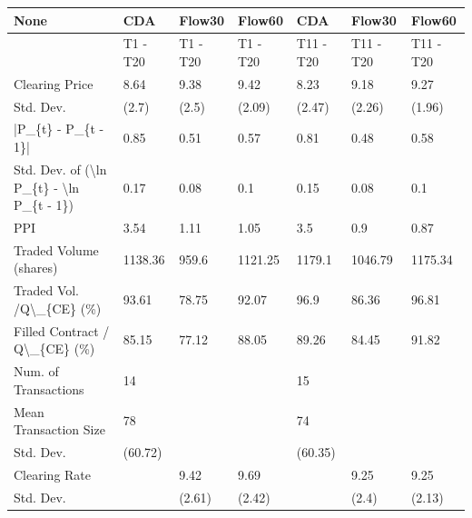 \begin{tabular}{lllllll}
\hline
 None                                                      & CDA      & Flow30   & Flow60   & CDA       & Flow30    & Flow60    \\
\hline
                                                           & T1 - T20 & T1 - T20 & T1 - T20 & T11 - T20 & T11 - T20 & T11 - T20 \\
 Clearing Price                                            & 8.64     & 9.38     & 9.42     & 8.23      & 9.18      & 9.27      \\
 Std. Dev.                                                 & (2.7)    & (2.5)    & (2.09)   & (2.47)    & (2.26)    & (1.96)    \\
 |P\_\{t\} - P\_\{t - 1\}|                                       & 0.85     & 0.51     & 0.57     & 0.81      & 0.48      & 0.58      \\
 Std. Dev. of (\textbackslash{}ln P\_\{t\} - \textbackslash{}ln P\_\{t - 1\})                  & 0.17     & 0.08     & 0.1      & 0.15      & 0.08      & 0.1       \\
 PPI                                                       & 3.54     & 1.11     & 1.05     & 3.5       & 0.9       & 0.87      \\
 Traded Volume (shares)                                    & 1138.36  & 959.6    & 1121.25  & 1179.1    & 1046.79   & 1175.34   \\
 Traded Vol. /Q\textbackslash{}\_\{CE\} (\%)                                  & 93.61    & 78.75    & 92.07    & 96.9      & 86.36     & 96.81     \\
 Filled Contract / Q\textbackslash{}\_\{CE\} (\%)                             & 85.15    & 77.12    & 88.05    & 89.26     & 84.45     & 91.82     \\
 Num. of Transactions                                      & 14       &          &          & 15        &           &           \\
 Mean Transaction Size                                     & 78       &          &          & 74        &           &           \\
 Std. Dev.                                                 & (60.72)  &          &          & (60.35)   &           &           \\
 Clearing Rate                                             &          & 9.42     & 9.69     &           & 9.25      & 9.25      \\
 Std. Dev.                                                 &          & (2.61)   & (2.42)   &           & (2.4)     & (2.13)    \\

\end{tabular}
